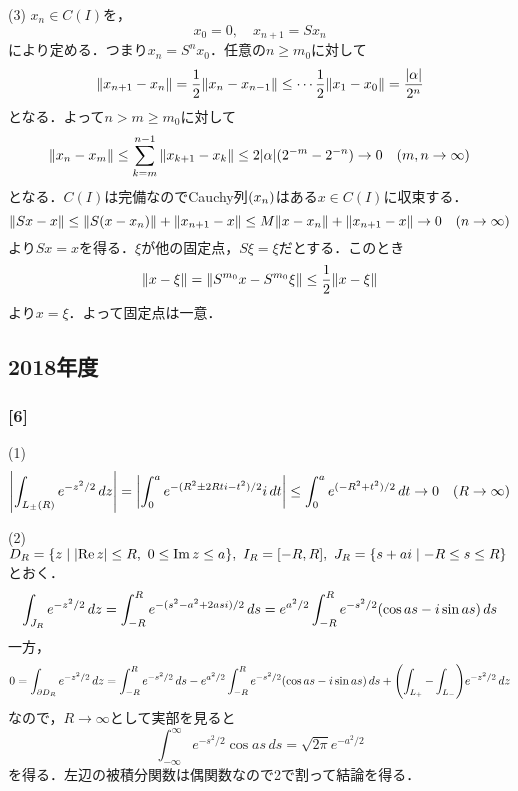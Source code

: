 \documentclass[a4j]{ltjsarticle}
\newcommand{\1}{\mathbbm{1}}
\numberwithin{equation}{section}
\theoremstyle{definition}
\begin{document}
(3) $x_n\in C(I)$を，
\begin{equation}
    x_0=0,\quad x_{n+1}=Sx_n 
\end{equation}
により定める．つまり$x_n=S^nx_0$．任意の$n\geq m_0$に対して
\begin{equation}
    \norm{x_{n+1}-x_n}=\frac{1}{2}\norm{x_n-x_{n-1}}\leq \cdots \frac{1}{2}\norm{x_1-x_0}=\frac{\abs{\alpha}}{2^n}
\end{equation}
となる．よって$n>m\geq m_0$に対して
\begin{equation}
    \norm{x_n-x_m}\leq\sum_{k=m}^{n-1}\norm{x_{k+1}-x_k}\leq 2\abs{\alpha} (2^{-m}-2^{-n})\to0\quad (m,n\to\infty)
\end{equation}
となる．$C(I)$は完備なのでCauchy列$\qty(x_n)$はある$x\in C(I)$に収束する．
\begin{equation}
    \norm{Sx-x}\leq \norm{S(x-x_n)}+\norm{x_{n+1}-x}\leq M\norm{x-x_n}+\norm{x_{n+1}-x}\to0\quad (n\to\infty)
\end{equation}
より$Sx=x$を得る．$\xi$が他の固定点，$S\xi=\xi$だとする．このとき
\begin{equation}
    \norm{x-\xi}=\norm{S^{m_0}x-S^{m_0}\xi}\leq \frac{1}{2}\norm{x-\xi}
\end{equation}
より$x=\xi$．よって固定点は一意．
\subsection{2018年度}
\subsubsection*{[6]}
(1) 
\begin{equation}
    \abs{\int_{L_{\pm}(R)}e^{-z^2/2}\,dz}=\abs{\int_{0}^{a}e^{-(R^2\pm 2Rti-t^2)/2}i\,dt}\leq \int_{0}^{a}e^{(-R^2+t^2)/2}\,dt\to0\quad (R\to\infty)
\end{equation}

(2) $D_R=\qty{z\mid \abs{\Re z}\leq R,\ 0\leq \Im z\leq a},\ I_R=[-R,R],\ J_R=\qty{s+ai\mid -R\leq s\leq R}$とおく．
\begin{equation}
    \int_{J_R}e^{-z^2/2}\,dz=\int_{-R}^{R}e^{-(s^2-a^2+2asi)/2}\,ds=e^{a^2/2}\int_{-R}^{R}e^{-s^2/2}\qty(\cos as-i\sin as)\,ds
\end{equation}
一方，
\begin{equation}
    0=\int_{\partial D_R}e^{-z^2/2}\,dz=\int_{-R}^{R}e^{-s^2/2}\,ds-e^{a^2/2}\int_{-R}^{R} e^{-s^2/2}(\cos as-i\sin as)\,ds+\qty(\int_{L_+}-\int_{L_-})e^{-z^2/2}\,dz
\end{equation}
なので，$R\to\infty$として実部を見ると
\begin{equation}
    \int_{-\infty}^{\infty}e^{-s^2/2}\cos as\,ds=\sqrt{2\pi}e^{-a^2/2}
\end{equation}
を得る．左辺の被積分関数は偶関数なので2で割って結論を得る．
\end{document}
